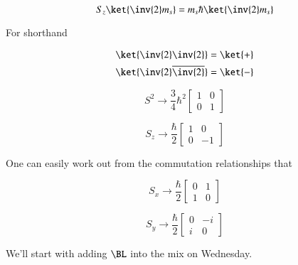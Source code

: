 \begin{equation}\label{eqn:qmTwoL13:490}
S_z 
\ket{\inv{2} m_s}  
= 
m_s \hbar 
\ket{\inv{2} m_s}  
\end{equation}

For shorthand

\begin{align}\label{eqn:qmTwoL13:510}
\ket{ \inv{2} \inv{2} } &= \ket{ + } \\
\ket{ \inv{2} \overline{\inv{2}} } &= \ket{ - }
\end{align}

\begin{equation}\label{eqn:qmTwoL13:530}
S^2 \rightarrow \frac{3}{4} \hbar^2 
\begin{bmatrix}
1 & 0 \\
0 & 1
\end{bmatrix}
\end{equation}

\begin{equation}\label{eqn:qmTwoL13:550}
S_z \rightarrow 
\frac{\hbar}{2}
\begin{bmatrix}
1 & 0 \\
0 & -1
\end{bmatrix}
\end{equation}

One can easily work out from the commutation relationships that

\begin{equation}\label{eqn:qmTwoL13:570}
S_x \rightarrow 
\frac{\hbar}{2}
\begin{bmatrix}
0 & 1 \\
1 & 0
\end{bmatrix}
\end{equation}

\begin{equation}\label{eqn:qmTwoL13:590}
S_y \rightarrow 
\frac{\hbar}{2}
\begin{bmatrix}
0 & -i \\
i & 0
\end{bmatrix}
\end{equation}

We'll start with adding $\BL$ into the mix on Wednesday.

\EndArticle
